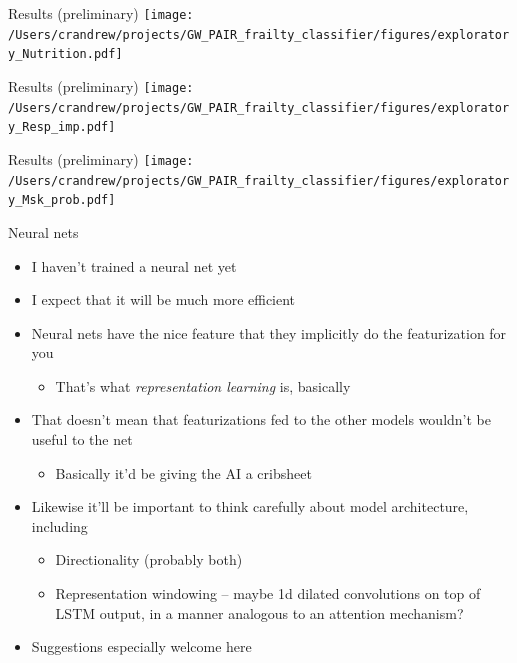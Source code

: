 \documentclass[10pt]{beamer}
\begin{document}
\begin{frame}{Results (preliminary)}
\texttt{[image: /Users/crandrew/projects/GW\_PAIR\_frailty\_classifier/figures/exploratory\_Nutrition.pdf]}
\end{frame}

\begin{frame}{Results (preliminary)}
\texttt{[image: /Users/crandrew/projects/GW\_PAIR\_frailty\_classifier/figures/exploratory\_Resp\_imp.pdf]}
\end{frame}

\begin{frame}{Results (preliminary)}
\texttt{[image: /Users/crandrew/projects/GW\_PAIR\_frailty\_classifier/figures/exploratory\_Msk\_prob.pdf]}
\end{frame}


\begin{frame}{Neural nets}
\begin{itemize}
\item I haven't trained a neural net yet
\item I expect that it will be much more efficient
\item Neural nets have the nice feature that they implicitly do the featurization for you
	\begin{itemize}
	\item That's what \textit{representation learning} is, basically
	\end{itemize}
\item That doesn't mean that featurizations fed to the other models wouldn't be useful to the net
	\begin{itemize}
	\item Basically it'd be giving the AI a cribsheet
	\end{itemize}
\item Likewise it'll be important to think carefully about model architecture, including
	\begin{itemize}
	\item Directionality (probably both)
	\item Representation windowing -- maybe 1d dilated convolutions on top of LSTM output, in a manner analogous to an attention mechanism?
	\end{itemize}
\item Suggestions especially welcome here
\end{itemize}
\end{frame}
\end{document}
